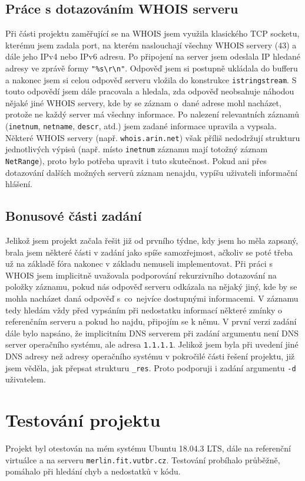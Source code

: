 \documentclass[a4paper, 11pt]{article}
\begin{document}
 \subsection{Práce s dotazováním WHOIS serveru}
 Při části projektu zaměřující se na WHOIS jsem využila klasického TCP socketu, kterému jsem zadala port, na kterém naslouchají všechny WHOIS servery (43) a dále jeho IPv4 nebo IPv6 adresu. Po připojení na server jsem odeslala IP hledané adresy ve zprávě formy \verb|"%s\r\n"|. Odpověď jsem si postupně ukládala do bufferu a nakonec jsem si celou odpověď serveru vložila do konstrukce \verb|istringstream|. S touto odpovědí jsem dále pracovala a hledala, zda odpověď neobsahuje náhodou nějaké jiné WHOIS servery, kde by se záznam o~dané adrese mohl nacházet, protože ne každý server má všechny informace. Po nalezení relevantních záznamů (\verb|inetnum|, \verb|netname|, \verb|descr|, atd.) jsem zadané informace upravila a vypsala. Některé WHOIS servery (např. \verb|whois.arin.net|) však příliš nedodržují strukturu jednotlivých výpisů (např. místo \verb|inetnum| záznamu mají totožný záznam \verb|NetRange|), proto bylo potřeba upravit i tuto skutečnost. Pokud ani přes dotazování dalších možných serverů záznam nenajdu, vypíšu uživateli informační hlášení.
 \subsection{Bonusové části zadání}
 Jelikož jsem projekt začala řešit již od prvního týdne, kdy jsem ho měla zapsaný, brala jsem některé části v zadání jako spíše samozřejmost, ačkoliv se poté třeba už na základě fóra nakonec v základu nemuseli implementovat. Při práci s WHOIS jsem implicitně uvažovala podporování rekurzivního dotazování na položky záznamu, pokud nás odpověď serveru odkázala na nějaký jiný, kde by se mohla nacházet daná odpověď s~co~nejvíce dostupnými informacemi. V záznamu tedy hledám vždy před vypsáním při nedostatku informací některé zmínky o referenčním serveru a pokud ho najdu, připojím se k němu.
 V první verzi zadání dále bylo napsáno, že implicitním DNS serverem při zadání argumentu není DNS server operačního systému, ale adresa \verb|1.1.1.1|. Jelikož jsem byla při uvedení jiné DNS adresy než adresy operačního systému v pokročilé části řešení projektu, již jsem věděla, jak přepsat strukturu \verb|_res|. Proto podporuji i zadání argumentu \verb|-d| uživatelem. 
\section{Testování projektu}
Projekt byl otestován na mém systému Ubuntu 18.04.3 LTS, dále na referenční virtuálce a na serveru \verb|merlin.fit.vutbr.cz|. Testování probíhalo průběžně, pomáhalo při hledání chyb a nedostatků v kódu.
\end{document}
